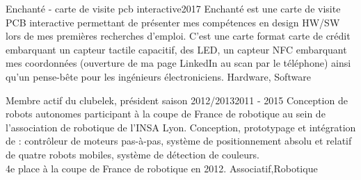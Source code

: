 %
%
%


\begin{projects}
	\project
	{Enchanté - carte de visite pcb interactive}{2017}
	{ }
	{Enchanté est une carte de visite PCB interactive permettant de présenter mes compétences en design HW/SW lors de mes premières recherches d'emploi.
	C'est une carte format carte de crédit embarquant un capteur tactile capacitif, des LED, un capteur NFC embarquant mes coordonnées (ouverture de ma page LinkedIn au scan par le téléphone) ainsi qu'un pense-bête pour les ingénieurs électroniciens.}
	{Hardware, Software}
				
	\project
	{Membre actif du clubelek, président saison 2012/2013}{2011 - 2015}
	{}
	{Conception de robots autonomes participant à la coupe de France de robotique au sein de l’association de robotique de l’INSA Lyon. Conception, prototypage et intégration de : contrôleur de moteurs pas-à-pas, système de positionnement absolu et relatif de quatre robots mobiles, système de détection de couleurs.\\
		4e place à la coupe de France de robotique en 2012.}
	{Associatif,Robotique}

\end{projects}